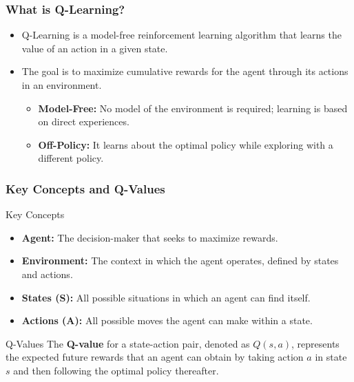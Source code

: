 \documentclass[aspectratio=169]{beamer}
\begin{document}
\begin{frame}[fragile]
    \frametitle{What is Q-Learning?}
    \begin{itemize}
        \item Q-Learning is a model-free reinforcement learning algorithm that learns the value of an action in a given state.
        \item The goal is to maximize cumulative rewards for the agent through its actions in an environment.
        \begin{itemize}
            \item \textbf{Model-Free:} No model of the environment is required; learning is based on direct experiences.
            \item \textbf{Off-Policy:} It learns about the optimal policy while exploring with a different policy.
        \end{itemize}
    \end{itemize}
\end{frame}

\begin{frame}[fragile]
    \frametitle{Key Concepts and Q-Values}
    \begin{block}{Key Concepts}
        \begin{itemize}
            \item \textbf{Agent:} The decision-maker that seeks to maximize rewards.
            \item \textbf{Environment:} The context in which the agent operates, defined by states and actions.
            \item \textbf{States (S):} All possible situations in which an agent can find itself.
            \item \textbf{Actions (A):} All possible moves the agent can make within a state.
        \end{itemize}
    \end{block}
    
    \begin{block}{Q-Values}
        The \textbf{Q-value} for a state-action pair, denoted as \( Q(s, a) \), represents the expected future rewards that an agent can obtain by taking action \( a \) in state \( s \) and then following the optimal policy thereafter.
    \end{block}
\end{frame}
\end{document}
